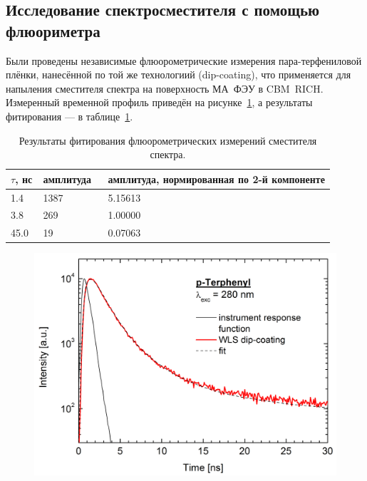 \subsection{Исследование спектросместителя с помощью флюориметра}


Были проведены независимые флюорометрические измерения пара-терфениловой плёнки, нанесённой по той же технологиий (dip-coating), что применяется для напыления сместителя спектра на поверхность МА~ФЭУ в CBM~RICH. Измеренный временной профиль приведён на рисунке~\ref{fig:MichaelProfile}, а результаты фитирования --- в таблице~\ref{tabl:MichaelValues}.

\begin{table}[H]
\caption{Результаты фитирования флюорометрических измерений сместителя спектра.}
\label{tabl:MichaelValues}
\begin{tabular}{ | p{0.1\linewidth} | p{0.2\linewidth} | p{0.7\linewidth} | }
	\hline
		$ \tau $, нс & амплитуда & амплитуда, нормированная по 2-й компоненте \\
	\hline
		1.4 & 1387 & 5.15613 \\
	\hline
		3.8 & 269 & 1.00000 \\
	\hline
		45.0 & 19 & 0.07063 \\
	\hline
\end{tabular}
\end{table}

\begin{figure}[H]
\includegraphics[width=1.0\textwidth]{pictures/Tau_fluoro_WLS_JLU.png}
\caption{}
\label{fig:MichaelProfile}
\end{figure}

